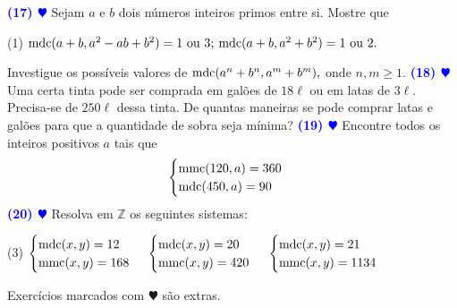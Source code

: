 \documentclass[12pt, a4paper]{article}
\newcommand{\mdc}{{\rm mdc}}
\newcommand{\mmc}{{\rm mmc}}
\newcommand{\negrito}[1]{\mbox{\boldmath{$#1$}}}
\begin{document}
\textcolor{blue}{\bf(17) $\varheart$} Sejam $a$ e $b$ dois números inteiros primos entre si. Mostre que
\begin{tasks}[counter-format={(tsk[a])},label-width=3.6ex, label-format = {\bfseries}, column-sep = {0pt}](1)
\task[\textcolor{Floresta}{$\negrito{(a)} $}] $\mdc(a+b, a^2 - ab  +b^2) = 1 \text{ ou } 3;$
\task[\textcolor{Floresta}{$\negrito{(b)} $}] $\mdc(a + b,a^2 + b^2)= 1 \text{ ou } 2.$
\end{tasks}
Investigue os possíveis valores de $\mdc(a^n + b^n, a^m + b^m),$ onde $n, m \ge 1.$
\newline\newline
\textcolor{blue}{\bf(18) $\varheart$} Uma certa tinta pode ser comprada em galões de $18\ell$ ou em latas de $3 \ell.$ Precisa-se de $250 \ell$ dessa tinta. De quantas maneiras se pode comprar latas e galões para que a quantidade de sobra seja mínima?
\newline\newline
\textcolor{blue}{\bf(19) $\varheart$} Encontre todos os inteiros positivos $a$ tais que
\[
\begin{cases}
\mmc(120,a) = 360 \\
\mdc(450, a) = 90
\end{cases}
\]
\textcolor{blue}{\bf(20) $\varheart$} Resolva em $\mathbb{Z}$ os seguintes sistemas:
\begin{tasks}[counter-format={(tsk[a])},label-width=3.6ex, label-format = {\bfseries}, column-sep = {0pt}](3)
\task[\textcolor{Floresta}{$\negrito{(a)} $}] $\begin{cases}
\mdc(x,y) = 12 \\
\mmc(x,y) = 168
\end{cases}$
\task[\textcolor{Floresta}{$\negrito{(b)} $}] $\begin{cases}
\mdc(x,y) = 20 \\
\mmc(x,y) = 420
\end{cases}$
\task[\textcolor{Floresta}{$\negrito{(c)} $}] $\begin{cases}
\mdc(x,y) = 21 \\
\mmc(x,y) = 1134
\end{cases}$
\end{tasks}



Exercícios marcados com $\varheart$ são extras.
\end{document}
